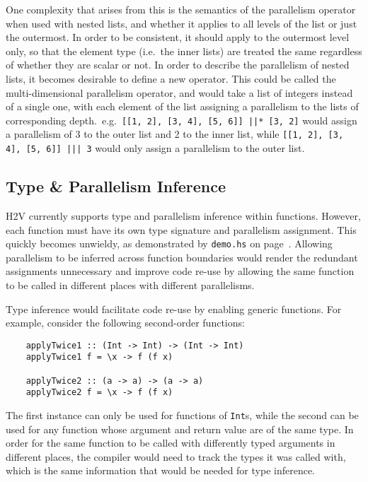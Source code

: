 \documentclass[english,onecolumn]{scrartcl}
\begin{document}
One complexity that arises from this is the semantics of the parallelism operator when used with nested lists, and whether it
applies to all levels of the list or just the outermost. In order to be consistent, it should apply to the outermost level only,
so that the element type (i.e.\ the inner lists) are treated the same regardless of whether they are scalar or not.
In order to describe the parallelism of nested lists, it becomes desirable to define a new operator. This could be called the
multi-dimensional parallelism operator, and would take a list of integers instead of a single one, with each element of the list
assigning a parallelism to the lists of corresponding depth.\ e.g.\ \texttt{[[1, 2], [3, 4], [5, 6]] ||* [3, 2]} would assign a
parallelism of 3 to the outer list and 2 to the inner list, while \texttt{[[1, 2], [3, 4], [5, 6]] ||| 3} would only assign a
parallelism to the outer list.


\subsection{Type \& Parallelism Inference}
H2V currently supports type and parallelism inference within functions. However, each function must have its own type signature
and parallelism assignment. This quickly becomes unwieldy, as demonstrated by \texttt{demo.hs} on page~\pageref{test:demo}. Allowing
parallelism to be inferred across function boundaries would render the redundant assignments unnecessary and improve code re-use
by allowing the same function to be called in different places with different parallelisms.

Type inference would facilitate code re-use by enabling generic functions. For example, consider the following second-order functions:

\begin{lstlisting}
    applyTwice1 :: (Int -> Int) -> (Int -> Int)
    applyTwice1 f = \x -> f (f x)

    applyTwice2 :: (a -> a) -> (a -> a)
    applyTwice2 f = \x -> f (f x)
\end{lstlisting}

The first instance can only be used for functions of \texttt{Int}s, while the second can be used for any function whose argument
and return value are of the same type. In order for the same function to be called with differently typed arguments in different
places, the compiler would need to track the types it was called with, which is the same information that would be needed for type
inference.
\end{document}
